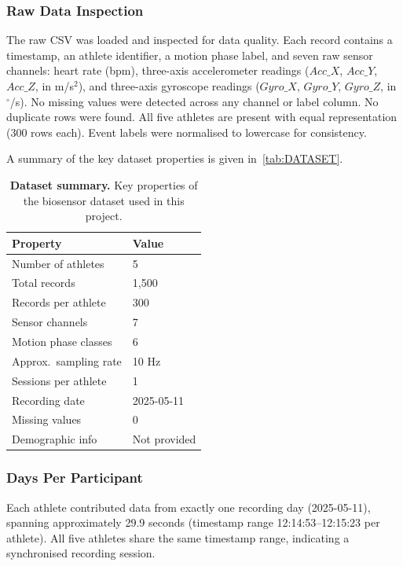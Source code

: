\documentclass[12pt,a4paper]{cibb}
\begin{document}
\subsubsection{Raw Data Inspection}
The raw CSV was loaded and inspected for data quality. Each record contains a
timestamp, an athlete identifier, a motion phase label, and seven raw sensor
channels: heart rate (bpm), three-axis accelerometer readings
($Acc\_X$, $Acc\_Y$, $Acc\_Z$, in m/s$^2$), and three-axis gyroscope
readings ($Gyro\_X$, $Gyro\_Y$, $Gyro\_Z$, in $^\circ$/s). No missing
values were detected across any channel or label column. No duplicate rows
were found. All five athletes are present with equal representation (300 rows
each). Event labels were normalised to lowercase for consistency.

A summary of the key dataset properties is given in~\autoref{tab:DATASET}.

\begin{table}[h!]
\centering
\small
    \begin{tabularx}{0.45\textwidth}{ l l }
        \toprule
        \textbf{Property} & \textbf{Value} \\
        \midrule
        \rowcolor{LightBlue} Number of athletes & 5 \\
        Total records & 1{,}500 \\
        \rowcolor{LightBlue} Records per athlete & 300 \\
        Sensor channels & 7 \\
        \rowcolor{LightBlue} Motion phase classes & 6 \\
        Approx.\ sampling rate & 10 Hz \\
        \rowcolor{LightBlue} Sessions per athlete & 1 \\
        Recording date & 2025-05-11 \\
        \rowcolor{LightBlue} Missing values & 0 \\
        Demographic info & Not provided \\
        \bottomrule
    \end{tabularx}
    \caption{\textbf{Dataset summary.} Key properties of the biosensor
    dataset used in this project.\label{tab:DATASET}}
\end{table}

\subsubsection{Days Per Participant}
Each athlete contributed data from exactly one recording day (2025-05-11),
spanning approximately 29.9 seconds (timestamp range 12:14:53--12:15:23 per
athlete). All five athletes share the same timestamp range, indicating a
synchronised recording session.
\end{document}
